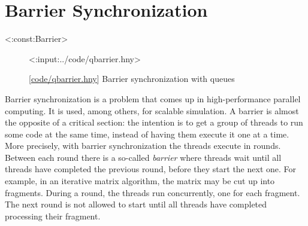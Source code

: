 \documentclass{report}
\newcommand{\harmonylink}[1]{%
[\href{https://harmony.cs.cornell.edu/#1}{\underline{#1}}]%
}
\newenvironment{code}{
\tcolorbox
}{
\endtcolorbox
}
\begin{document}
{\chapter{Barrier Synchronization}
\label{ch:barrier}
%

<{:const:Barrier}>

%

\begin{figure}
\begin{code}
<{:input:../code/qbarrier.hny}>
\end{code}
\caption{\harmonylink{code/qbarrier.hny} Barrier synchronization with queues}
\label{fig:barrier}
\end{figure}

Barrier synchronization is a problem that comes up in high-performance
parallel computing.
It is used, among others, for scalable simulation.
A barrier is almost the opposite of a critical section:
the intention is to get a group of threads to run some code at the
same time, instead of having them execute it one at a time.
More precisely, with barrier synchronization the threads execute in rounds.
Between each round there is a so-called \emph{barrier} where threads wait
until all threads have completed the previous round, before they start the
next one.
For example, in an iterative matrix algorithm, the matrix may be
cut up into fragments.  During a round, the threads run concurrently,
one for each fragment.  The next round is not allowed to start
until all threads have completed processing their fragment.

}
\end{document}
